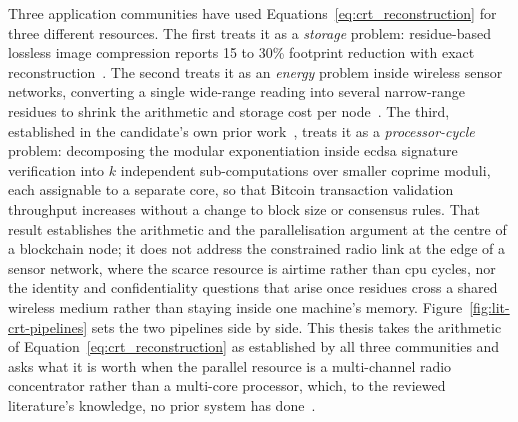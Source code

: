 \documentclass[12pt,a4paper,oneside]{book}
\begin{document}
Three application communities have used
Equations~\ref{eq:crt_reconstruction} for three different resources. The
first treats it as a \emph{storage} problem: residue-based lossless image
compression reports 15 to 30\% footprint reduction with exact
reconstruction~\cite{vidhya2021crt, crtcompression2018}. The second treats
it as an \emph{energy} problem inside wireless sensor
networks, converting a single wide-range reading into several
narrow-range residues to shrink the arithmetic and storage cost per
node~\cite{rahman2022rnsenergy, khan2023fuzzycrt, djeddi2025parallelCRT}.
The third, established in the candidate's own prior
work~\cite{beloa2025bitcoincrt}, treats it as a \emph{processor-cycle}
problem: decomposing the modular exponentiation inside \gls{ecdsa}
signature verification into $k$ independent sub-computations over smaller
coprime moduli, each assignable to a separate core, so that Bitcoin
transaction validation throughput increases without a change to block size
or consensus rules. That result establishes the arithmetic and the
parallelisation argument at the centre of a blockchain node; it does not
address the constrained radio link at the edge of a sensor network, where
the scarce resource is airtime rather than \gls{cpu} cycles, nor the
identity and confidentiality questions that arise once residues cross a
shared wireless medium rather than staying inside one machine's memory.
Figure~\ref{fig:lit-crt-pipelines} sets the two pipelines side by side.
This thesis takes the arithmetic of Equation~\ref{eq:crt_reconstruction} as
established by all three communities and asks what it is worth when the
parallel resource is a multi-channel radio concentrator rather than a
multi-core processor, which, to the reviewed literature's knowledge, no
prior system has done~\cite{wang2018novel}.
\end{document}

